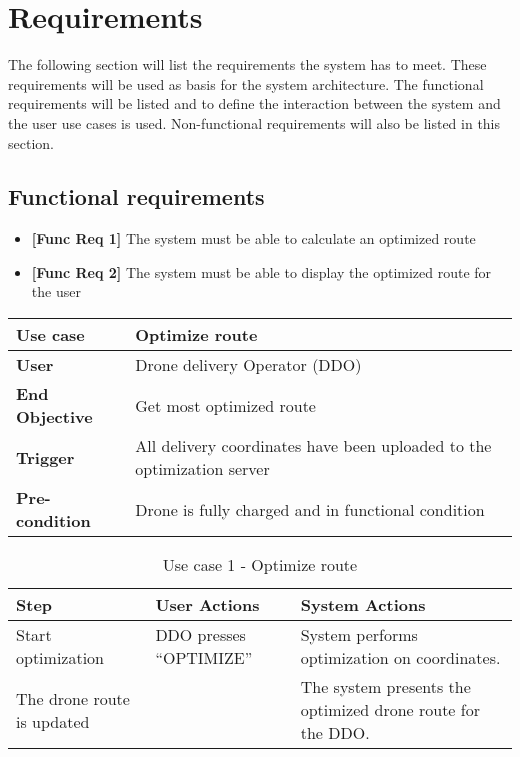 
\chapter{Requirements}

The following section will list the requirements the system has to meet. These requirements will be used as basis for the system architecture. The functional requirements will be listed and to define the interaction between the system and the user use cases is used. Non-functional requirements will also be listed in this section. 

\section{Functional requirements}
\begin{itemize}
	\item \textbf{[Func Req 1]} The system must be able to calculate an optimized route
	\item \textbf{[Func Req 2]} The system must be able to display the optimized route for the user
\end{itemize}

\begin{table}[H]
	\begin{tabular}{|l|l|}
		\hline
		\cellcolor[HTML]{EFEFEF} \textbf{Use case}  & \cellcolor[HTML]{EFEFEF} \textbf{Optimize route}\\ \hline
		\cellcolor[HTML]{EFEFEF} \textbf{User} &  Drone delivery Operator (DDO) \\ \hline
		\cellcolor[HTML]{EFEFEF} \textbf{End Objective} &  Get most optimized route\\ \hline
		\cellcolor[HTML]{EFEFEF} \textbf{Trigger} & All delivery coordinates have been uploaded to the optimization server \\ \hline 
		\cellcolor[HTML]{EFEFEF} \textbf{Pre-condition} & Drone is fully charged and in functional condition \\ \hline
	\end{tabular}
\end{table}


\begin{table}[H]
	\centering
	
	\label{Use_case_1_optimize_route}
	
	\begin{tabular}{|p{2cm}|p{5cm}|p{5cm}|}
		\hline
		\cellcolor[HTML]{EFEFEF} \textbf{Step} & \cellcolor[HTML]{EFEFEF} \textbf{User Actions}  & \cellcolor[HTML]{EFEFEF} \textbf{System Actions} \\ \hline
		\cellcolor[HTML]{EFEFEF} Start optimization &  DDO presses “OPTIMIZE”  & System performs optimization on coordinates. \\ \hline
		\cellcolor[HTML]{EFEFEF} The drone route is updated   &     &  The system presents the optimized drone route for the DDO.  \\ \hline
		
	\end{tabular}
	\caption{Use case 1 - Optimize route}
\end{table}


